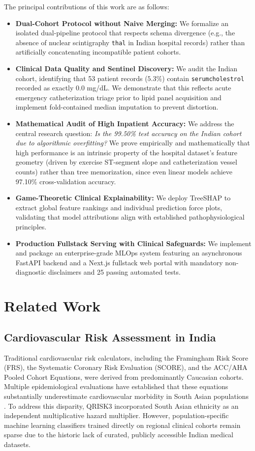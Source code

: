 \documentclass[conference]{IEEEtran}
\begin{document}
The principal contributions of this work are as follows:
\begin{itemize}
    \item \textbf{Dual-Cohort Protocol without Naive Merging:} We formalize an isolated dual-pipeline protocol that respects schema divergence (e.g., the absence of nuclear scintigraphy \texttt{thal} in Indian hospital records) rather than artificially concatenating incompatible patient cohorts.
    \item \textbf{Clinical Data Quality and Sentinel Discovery:} We audit the Indian cohort, identifying that 53 patient records ($5.3\%$) contain \texttt{serumcholestrol} recorded as exactly 0.0 mg/dL. We demonstrate that this reflects acute emergency catheterization triage prior to lipid panel acquisition and implement fold-contained median imputation to prevent distortion.
    \item \textbf{Mathematical Audit of High Inpatient Accuracy:} We address the central research question: \textit{Is the 99.50\% test accuracy on the Indian cohort due to algorithmic overfitting?} We prove empirically and mathematically that high performance is an intrinsic property of the hospital dataset's feature geometry (driven by exercise ST-segment slope and catheterization vessel counts) rather than tree memorization, since even linear models achieve 97.10\% cross-validation accuracy.
    \item \textbf{Game-Theoretic Clinical Explainability:} We deploy TreeSHAP \cite{lundberg2017} to extract global feature rankings and individual prediction force plots, validating that model attributions align with established pathophysiological principles.
    \item \textbf{Production Fullstack Serving with Clinical Safeguards:} We implement and package an enterprise-grade MLOps system featuring an asynchronous FastAPI backend and a Next.js fullstack web portal with mandatory non-diagnostic disclaimers and 25 passing automated tests.
\end{itemize}

\section{Related Work}

\subsection{Cardiovascular Risk Assessment in India}
Traditional cardiovascular risk calculators, including the Framingham Risk Score (FRS), the Systematic Coronary Risk Evaluation (SCORE), and the ACC/AHA Pooled Cohort Equations, were derived from predominantly Caucasian cohorts. Multiple epidemiological evaluations have established that these equations substantially underestimate cardiovascular morbidity in South Asian populations \cite{prabhakaran2016}. To address this disparity, QRISK3 incorporated South Asian ethnicity as an independent multiplicative hazard multiplier. However, population-specific machine learning classifiers trained directly on regional clinical cohorts remain sparse due to the historic lack of curated, publicly accessible Indian medical datasets.
\end{document}
